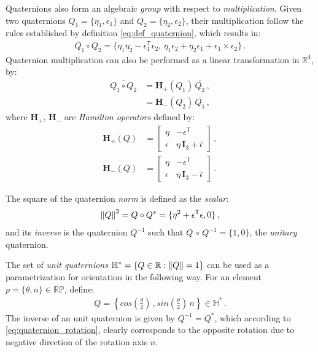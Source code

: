 Quaternions also form an algebraic {\it group} with respect to {\it multiplication}.
Given two quaternions $Q_1=\{\eta_1,\epsilon_1\}$ and $Q_2=\{\eta_2,\epsilon_2\}$, their multiplication follow the rules established by definition \eqref{eq:def_quaternion}, which results in:
%
\begin{align}
Q_1\circ Q_2 = \{\eta_1\eta_2 - \epsilon_1^\mathsf{T}\epsilon_2 ,\, \eta_1\epsilon_2 + \eta_2\epsilon_1 + \epsilon_1 \times \epsilon_2 \} \,.
\label{eq:quaternion_product}
\end{align}
%
Quaternion multiplication can also be performed as a linear transformation in $\mathbb{R}^4$, by:
%
\begin{align}
\overline{Q_1 \circ Q_2} &= \mathbf{H}_+(Q_1) \, \overline{Q_2} \,, \\
&= \mathbf{H}_-(Q_2) \, \overline{Q_1} \,,
\label{eq:multipl_Hamilton}
\end{align}
%
where $\mathbf{H}_+$, $\mathbf{H}_-$ are {\it Hamilton operators} defined by:
%
\begin{align}
\mathbf{H}_+(Q) &= \left[ \begin{array}{cc}
\eta & -\epsilon^\mathsf{T} \\
\epsilon & \eta \, \mathbf{I}_3 + \widehat{\epsilon}
\end{array} \right] \,, \\
\mathbf{H}_-(Q) &= \left[ \begin{array}{cc}
\eta & -\epsilon^\mathsf{T} \\
\epsilon & \eta \, \mathbf{I}_3 - \widehat{\epsilon}
\end{array} \right] \,.
\label{eq:Hamilton_op}
\end{align}

The square of the quaternion \textit{norm} is defined as the \textit{scalar}:
%
\begin{align}
\left\lVert Q\right\rVert^2 = Q \circ Q^* = \{ \eta^2 + \epsilon^\mathsf{T} \epsilon , 0 \} \,,
\end{align}
%
and its \textit{inverse} is the quaternion $Q^{-1}$ such that $Q \,\circ\, Q^{-1} = \{1,0\}$, the {\it unitary} quaternion.

The set of \textit{unit quaternions} $\mathbb{H}^* = \{ Q \in \mathbb{R}: \left\lVert Q\right\rVert = 1 \}$ can be used as a parametrization for orientation in the following way.
%
For an element $p = \{\theta,n\}\in \mathbb{RP}$, define:
%
\begin{align}
Q = \left\{cos\left(\frac{\theta}{2}\right) \,, sin\left(\frac{\theta}{2}\right)\,n\right\} \in \mathbb{H}^* \,.
\label{eq:quaternion_rotation}
\end{align}
%
The inverse of an unit quaternion is given by $Q^{-1} \!\!=\!\! Q^*$, 
which according to \eqref{eq:quaternion_rotation}, clearly corresponds to the opposite rotation due to negative direction of the rotation axis $n$.

